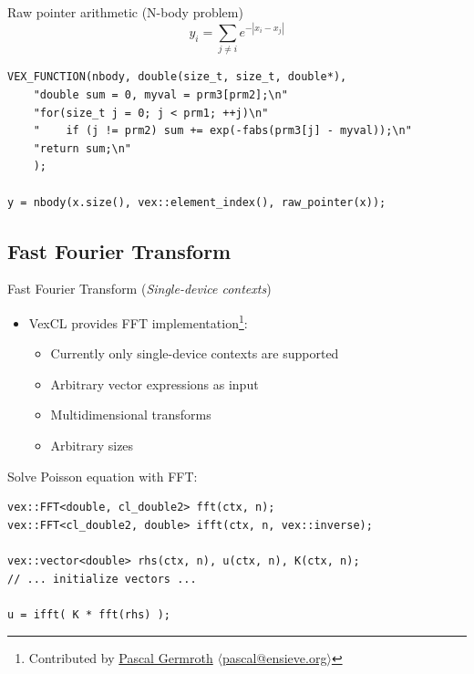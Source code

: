 \documentclass[@BEAMER_OPTIONS@]{beamer}
\newcommand{\singledevice}{\hspace{1cm}\footnotesize(\emph{Single-device contexts})}
\begin{document}
\note{ }

\begin{frame}[fragile]{Raw pointer arithmetic (N-body problem)}
    \begin{equation*}
        y_i = \sum_{j \neq i} e^{-|x_i - x_j|}
    \end{equation*}
    \begin{exampleblock}{}
        \begin{lstlisting}
VEX_FUNCTION(nbody, double(size_t, size_t, double*),
    "double sum = 0, myval = prm3[prm2];\n"
    "for(size_t j = 0; j < prm1; ++j)\n"
    "    if (j != prm2) sum += exp(-fabs(prm3[j] - myval));\n"
    "return sum;\n"
    );

y = nbody(x.size(), vex::element_index(), raw_pointer(x));
        \end{lstlisting}
    \end{exampleblock}
\end{frame}

\note{ }

\subsection{Fast Fourier Transform}

\begin{frame}[fragile]{Fast Fourier Transform \singledevice}
    \begin{itemize}
        \item VexCL provides FFT implementation\footnote{Contributed by
            \href{https://github.com/neapel}{Pascal Germroth}
            $\langle$\href{mailto:pascal@ensieve.org}{pascal@ensieve.org}$\rangle$}:
            \begin{itemize}
                \item Currently only single-device contexts are supported
                \item Arbitrary vector expressions as input
                \item Multidimensional transforms
                \item Arbitrary sizes
            \end{itemize}
    \end{itemize}
    \begin{exampleblock}{Solve Poisson equation with FFT:}
        \begin{lstlisting}
vex::FFT<double, cl_double2> fft(ctx, n);
vex::FFT<cl_double2, double> ifft(ctx, n, vex::inverse);

vex::vector<double> rhs(ctx, n), u(ctx, n), K(ctx, n);
// ... initialize vectors ...

u = ifft( K * fft(rhs) );
        \end{lstlisting}
    \end{exampleblock}
\end{frame}
\end{document}
